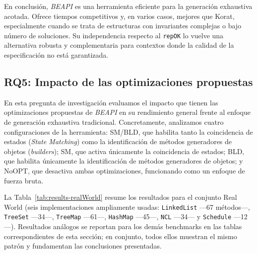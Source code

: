 En conclusión, \emph{BEAPI} es una herramienta eficiente para la generación exhaustiva acotada. 
Ofrece tiempos competitivos y, en varios casos, mejores que \textsf{Korat}, especialmente cuando 
se trata de estructuras con invariantes complejas o bajo número de soluciones. Su independencia 
respecto al \texttt{repOK} lo vuelve una alternativa robusta y complementaria para contextos donde 
la calidad de la especificación no está garantizada.


\subsection{RQ5: Impacto de las optimizaciones propuestas}
\label{sec:optimizations}

En esta pregunta de investigación evaluamos el impacto que tienen las optimizaciones propuestas 
de \emph{BEAPI} en su rendimiento general frente al enfoque de generación exhaustiva tradicional. 
Concretamente, analizamos cuatro configuraciones de la herramienta: \textsf{SM/BLD}, que habilita tanto 
la coincidencia de estados (\emph{State Matching}) como la identificación de métodos generadores de objetos (\emph{builders}); 
\textsf{SM}, que activa únicamente la coincidencia de estados; \textsf{BLD}, que habilita únicamente 
la identificación de métodos generadores de objetos; y \textsf{NoOPT}, que desactiva ambas optimizaciones, funcionando 
como un enfoque de fuerza bruta.


La Tabla~\ref{tab:results-realWorld}  resume los resultados para el conjunto \textsf{Real World} 
(seis implementaciones ampliamente usadas: \texttt{LinkedList} —67 métodos—, \texttt{TreeSet} —34—, \texttt{TreeMap} —61—, \texttt{HashMap} —45—, \texttt{NCL} —34— y \texttt{Schedule} —12—). 
Resultados análogos se reportan para los demás benchmarks en las tablas correspondientes de esta sección; en conjunto, todos ellos muestran el mismo patrón y fundamentan las conclusiones presentadas.

